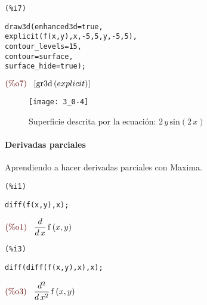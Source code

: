 \documentclass[12pt]{article}
\begin{document}
\noindent
\begin{minipage}[t]{8ex}{\color{red}\bf
\begin{verbatim}
(%i7) 
\end{verbatim}}
\end{minipage}
\begin{minipage}[t]{\textwidth}{\color{blue}
\begin{verbatim}
draw3d(enhanced3d=true,
explicit(f(x,y),x,-5,5,y,-5,5),
contour_levels=15,
contour=surface,
surface_hide=true);
\end{verbatim}}
\end{minipage}
\begin{math}\displaystyle
\parbox{8ex}{\color{labelcolor}(\%o7) }
[\mathrm{gr3d}\left( explicit\right) ]
\end{math}
\begin{figure}[H]
\centering
\texttt{[image: 3\_0-4]}
\caption{Superficie descrita por la ecuación: $2\,y\,\mathrm{sin}\left( 2\,x\right) $}
\end{figure}

\paragraph{Derivadas parciales} Aprendiendo a hacer derivadas parciales con Maxima.

\noindent
\begin{minipage}[t]{8ex}{\color{red}\bf
\begin{verbatim}
(%i1) 
\end{verbatim}}
\end{minipage}
\begin{minipage}[t]{\textwidth}{\color{blue}
\begin{verbatim}
diff(f(x,y),x);
\end{verbatim}}
\end{minipage}
\begin{math}\displaystyle
\parbox{8ex}{\color{labelcolor}(\%o1) }
\frac{d}{d\,x}\,\mathrm{f}\left( x,y\right) 
\end{math}


\noindent
\begin{minipage}[t]{8ex}{\color{red}\bf
\begin{verbatim}
(%i3) 
\end{verbatim}}
\end{minipage}
\begin{minipage}[t]{\textwidth}{\color{blue}
\begin{verbatim}
diff(diff(f(x,y),x),x);
\end{verbatim}}
\end{minipage}
\begin{math}\displaystyle
\parbox{8ex}{\color{labelcolor}(\%o3) }
\frac{{d}^{2}}{d\,{x}^{2}}\,\mathrm{f}\left( x,y\right) 
\end{math}
\end{document}
